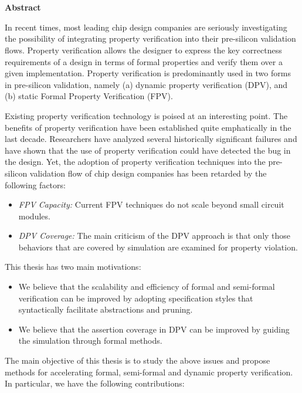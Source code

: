 \chapter*{}
\vspace*{-2in}
\begin{center}
\Large \bf {Abstract}
\end{center}

\noindent
In recent times, most leading
chip design companies are seriously investigating the possibility of
integrating property verification into their pre-silicon validation flows.
Property verification allows the designer to express the key
correctness requirements of a design in terms of formal properties and
verify them over a given implementation. 
Property verification is predominantly used in two forms in pre-silicon
validation, namely (a) dynamic property verification (DPV), and
(b) static Formal Property Verification (FPV).

\noindent
Existing property verification technology is poised at an interesting point. 
The benefits of property verification have been established quite
emphatically in the last decade. Researchers have analyzed several
historically significant failures and have shown that the use of property
verification could have detected the bug in the design.
Yet, the adoption of property verification techniques into the 
pre-silicon validation flow of chip design companies has been retarded 
by the following factors:
\begin{itemize}

\item {\em FPV Capacity:} Current FPV techniques do not scale
    beyond small circuit modules. 

\item {\em DPV Coverage:} The main criticism of the DPV approach is that 
	only those behaviors that are covered by simulation are examined for 
	property violation. 

\end{itemize}

\noindent
This thesis has two main motivations:

\begin{itemize}

\item We believe that the scalability and efficiency of formal and 
	semi-formal verification can be improved by adopting specification styles 
	that syntactically facilitate abstractions and pruning.

\item We believe that the assertion coverage in DPV 
	can be improved by guiding the simulation through formal 
	methods.
\end{itemize}
\noindent
The main objective of this thesis is to study the above issues
and propose methods for accelerating formal, semi-formal and dynamic 
property verification.
In particular, we have the following contributions:


